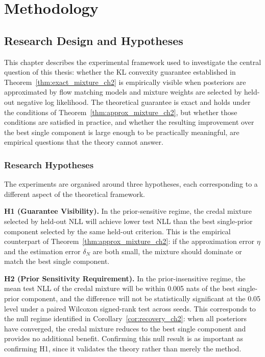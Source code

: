 \chapter{Methodology}
\label{chap:methodology}

\section{Research Design and Hypotheses}

This chapter describes the experimental framework 
used to investigate the central question of this 
thesis: whether the KL convexity guarantee 
established in Theorem~\ref{thm:exact_mixture_ch2} 
is empirically visible when posteriors are 
approximated by flow matching models and mixture 
weights are selected by held-out negative log 
likelihood. The theoretical guarantee is exact 
and holds under the conditions of 
Theorem~\ref{thm:approx_mixture_ch2}, but whether 
those conditions are satisfied in practice, and 
whether the resulting improvement over the best 
single component is large enough to be practically 
meaningful, are empirical questions that the 
theory cannot answer.

\subsection{Research Hypotheses}

The experiments are organised around three 
hypotheses, each corresponding to a different 
aspect of the theoretical framework.

\textbf{H1 (Guarantee Visibility).} In the 
prior-sensitive regime, the credal mixture 
selected by held-out NLL will achieve lower 
test NLL than the best single-prior component 
selected by the same held-out criterion. This 
is the empirical counterpart of 
Theorem~\ref{thm:approx_mixture_ch2}: if the 
approximation error $\eta$ and the estimation 
error $\delta_N$ are both small, the mixture 
should dominate or match the best single 
component.

\textbf{H2 (Prior Sensitivity Requirement).} 
In the prior-insensitive regime, the mean 
test NLL of the credal mixture will be within 
0.005 nats of the best single-prior component, 
and the difference will not be statistically 
significant at the 0.05 level under a paired 
Wilcoxon signed-rank test across seeds. This 
corresponds to the null regime identified in 
Corollary~\ref{cor:recovery_ch2}: when all 
posteriors have converged, the credal mixture 
reduces to the best single component and 
provides no additional benefit. Confirming 
this null result is as important as confirming 
H1, since it validates the theory rather than 
merely the method.

